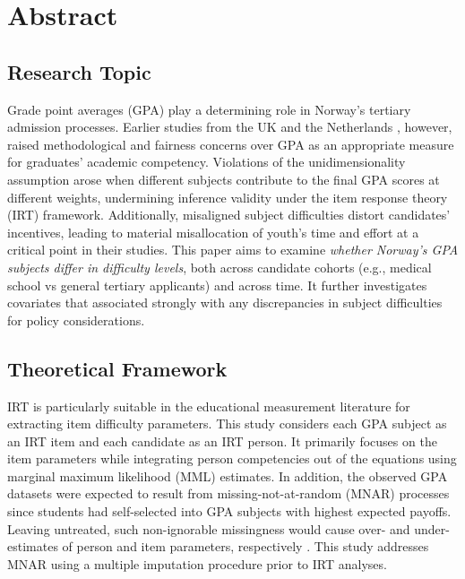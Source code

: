 \section{Abstract}


\subsection{Research Topic}

Grade point averages (GPA) play a determining role in Norway's tertiary admission processes. Earlier studies from the UK \parencite{he:2018} and the Netherlands \parencite{korobko:2008}, however, raised methodological and fairness concerns over GPA as an appropriate measure for graduates' academic competency. Violations of the unidimensionality assumption arose when different subjects contribute to the final GPA scores at different weights, undermining inference validity under the item response theory (IRT) framework. Additionally, misaligned subject difficulties distort candidates' incentives, leading to material misallocation of youth's time and effort at a critical point in their studies. This paper aims to examine \emph{whether Norway's GPA subjects differ in difficulty levels}, both across candidate cohorts (e.g., medical school vs general tertiary applicants) and across time. It further investigates covariates that associated strongly with any discrepancies in subject difficulties for policy considerations.

\subsection{Theoretical Framework}

IRT is particularly suitable in the educational measurement literature for extracting item difficulty parameters. This study considers each GPA subject as an IRT item and each candidate as an IRT person. It primarily focuses on the item parameters while integrating person competencies out of the equations using marginal maximum likelihood (MML) estimates. In addition, the observed GPA datasets were expected to result from missing-not-at-random (MNAR) processes since students had self-selected into GPA subjects with highest expected payoffs. Leaving untreated, such non-ignorable missingness would cause over- and under-estimates of person and item parameters, respectively \parencite{rose:2013}. This study addresses MNAR using a multiple imputation procedure prior to IRT analyses.

